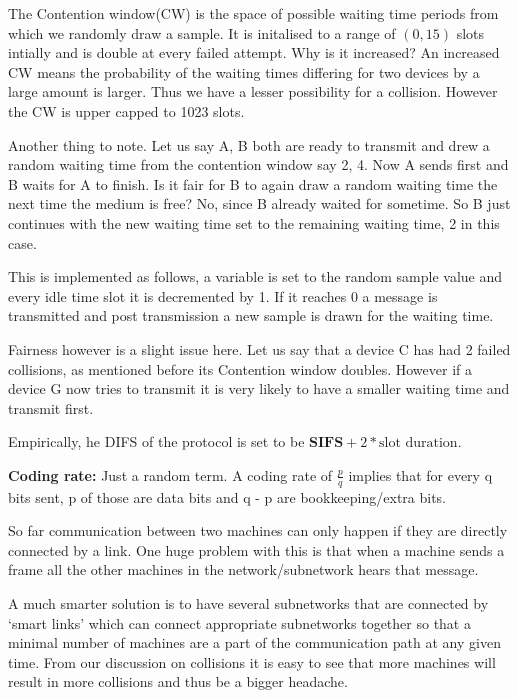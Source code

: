 \documentclass[12pt]{article}
\newcommand{\tbox}[1]{\noindent\fbox{\parbox{\textwidth}{#1}}}
\begin{document}
The Contention window(CW) is the space of possible waiting time periods from which we randomly draw a sample. 
It is initalised to a range of \((0,15)\) slots intially and is double at every failed attempt. 
Why is it increased? An increased CW means the probability of the waiting times differing for two devices by a large amount is larger. Thus 
we have a lesser possibility for a collision. However the CW is upper capped to 1023 slots. 

Another thing to note. Let us say A, B both are ready to transmit and drew a random waiting time from the 
contention window say 2, 4. Now A sends first and B waits for A to finish. Is it fair for B to again draw a random waiting time the 
next time the medium is free? No, since B already waited for sometime. So B just continues with the new waiting time set to the remaining
waiting time, 2 in this case. 


This is implemented as follows, a variable is set to the random sample value and every idle time slot it is decremented by 1. 
If it reaches 0 a message is transmitted and post transmission a new sample is drawn for the waiting time. 

Fairness however is a slight issue here. Let us say that a device C has had 2 failed collisions, as mentioned before its Contention window doubles. 
However if a device G now tries to transmit it is very likely to have a smaller waiting time and transmit first. 


Empirically, he DIFS of the protocol is set to be \(\textbf{SIFS} + 2*\text{slot duration}\). 


\textbf{Coding rate:} Just a random term. A coding rate of \(\frac{p}{q}\) implies that for every q bits sent, p of those are data bits and 
q - p are bookkeeping/extra bits. 

\noindent\tbox{
    \begin{center}
    \textbf{\Huge Lecture 18}

    Not yet completely done
    \end{center}
}



So far communication between two machines can only happen if they 
are directly connected by a link. One huge problem with this is that when a machine sends a frame 
all the other machines in the network/subnetwork hears that message. 

A much smarter solution is to have several subnetworks that are connected by `smart links' which can connect appropriate subnetworks together 
so that a minimal number of machines are a part of the communication path at any given time. From our 
discussion on collisions it is easy to see that more machines will result in more collisions and thus be a bigger headache. 
\end{document}
